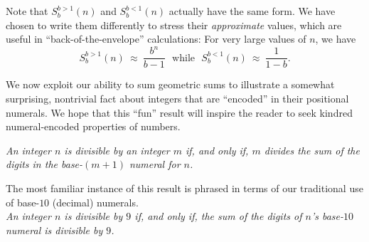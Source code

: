 \documentclass{article}
\begin{document}
Note that $S^{b>1}_{b}(n)$ and $S^{b<1}_{b}(n)$ actually have the same
form.  We have chosen to write them differently to stress their {\em
  approximate} values, which are useful in ``back-of-the-envelope''
calculations:  For very large values of $n$, we have
\begin{equation}
\label{eq:geom-sum:approx}
S^{b>1}_{b}(n) \ \approx \ \frac{b^n}{b-1} \ \ \
\mbox{while} \ \ \
S^{b<1}_{b}(n) \ \approx \ \frac{1}{1-b} .
\end{equation}

\medskip


We now exploit our ability to sum geometric sums to illustrate a
somewhat surprising, nontrivial fact about integers that are
``encoded'' in their positional numerals.  We hope that this ``fun''
result will inspire the reader to seek kindred numeral-encoded
properties of numbers.

\label{thm:div-by-b-bar}
{\it
An integer $n$ is divisible by an integer $m$ if, and only if, $m$
divides the sum of the digits in the base-$(m+1)$ numeral for $n$.
}

The most familiar instance of this result is phrased in terms of our
traditional use of base-$10$ (decimal) numerals. \\
{\it An integer $n$ is divisible by $9$ if, and only if, the sum of
  the digits of $n$'s base-$10$ numeral is divisible by $9$.}

\smallskip
\end{document}
